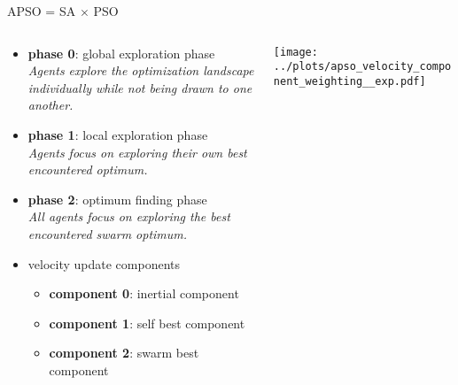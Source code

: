 \documentclass[11pt,aspectratio=169]{beamer}
\begin{document}
%
%

\begin{frame}[fragile]{APSO = SA $\times$ PSO}
    \begin{columns}
    \begin{column}{0.5\textwidth}

        \begin{itemize}
            \item \textbf{phase 0}: global exploration phase\\
                {\scriptsize{\textit{Agents explore the optimization landscape individually while not being drawn to one another.}}}
            \item \textbf{phase 1}: local exploration phase\\
                {\scriptsize{\textit{Agents focus on exploring their own best encountered optimum.}}}

            \item \textbf{phase 2}: optimum finding phase\\
                {\scriptsize{\textit{All agents focus on exploring the best encountered swarm optimum.}}}

            \smallskip
            \item velocity update components
            \begin{itemize}
                \item \textbf{component 0}: inertial component
                \item \textbf{component 1}: self best component
                \item \textbf{component 2}: swarm best component
            \end{itemize}
        \end{itemize}
    \end{column}

    \begin{column}{0.45\textwidth}
        \texttt{[image: ../plots/apso\_velocity\_component\_weighting\_\_exp.pdf]}
    \end{column}
    \end{columns}
\end{frame}
\end{document}
